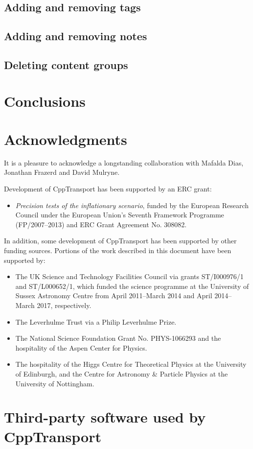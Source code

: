 \documentclass[11pt,a4paper]{article}
\newcommand{\packagefont}{\sffamily}
\newcommand{\CppTransport}{{\packagefont CppTransport}}
\begin{document}
\subsection{Adding and removing tags}
\label{sec:add-remove-tags}

\subsection{Adding and removing notes}
\label{sec:add-remove-notes}

\subsection{Deleting content groups}
\label{sec:delete-content}

\section{Conclusions} 

\section{Acknowledgments}
It is a pleasure to acknowledge a longstanding collaboration
with
Mafalda Dias,
Jonathan Frazerd
and David Mulryne.

Development of {\CppTransport} has been supported
by an ERC grant:
\begin{itemize}
    \item \emph{Precision tests of the inflationary
    scenario},
    funded by
    the European Research Council under the European Union's
    Seventh Framework Programme (FP/2007--2013) and ERC Grant Agreement No. 308082.
\end{itemize}
In addition,
some development of {\CppTransport} has been supported by
other funding sources.
Portions of
the work described in this document have been supported by:
\begin{itemize}
    \item The UK
    Science and Technology Facilities Council via grants
    ST/I000976/1 and ST/L000652/1,
    which funded the science programme at the University of Sussex Astronomy
    Centre from April 2011--March 2014
    and April 2014--March 2017, respectively.
    \item The Leverhulme Trust via a Philip Leverhulme Prize.
    \item The National Science Foundation Grant No. PHYS-1066293
    and the hospitality of the Aspen Center for Physics.
    \item The hospitality of the Higgs Centre for Theoretical
    Physics at the University of Edinburgh,
    and the Centre for Astronomy \& Particle Physics
    at the University of Nottingham.
\end{itemize}

\appendix

\section{Third-party software used by {\CppTransport}}



\end{document}
